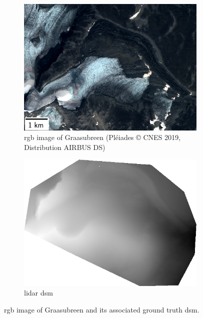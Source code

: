 \begin{figure}
    \centering
    \begin{subfigure}[t]{0.48\linewidth}
        \flushleft
        \includegraphics[width=\linewidth]{Images/Chap_6/miniature_Graasubreen.png}
        \caption{\acrshort{rgb} image of Graasubreen (Pléiades © CNES 2019, Distribution AIRBUS DS)}
        \label{fig:miniature_Graasubreen_rgb}
    \end{subfigure}\hfill
    \begin{subfigure}[t]{0.48\linewidth}
        \flushright
        \includegraphics[width=\linewidth]{Images/Chap_6/miniature_Graasubreen_gt.png}
        \caption{\acrshort{lidar} \acrshort{dsm}}
        \label{fig:miniature_Graasubreen_gt}
    \end{subfigure}
    \caption{\acrshort{rgb} image of Graasubreen and its associated ground truth \acrshort{dsm}.}
    \label{fig:miniature_Graasubreen}
\end{figure}

